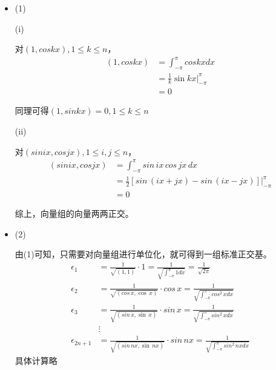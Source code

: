 \documentclass{article}
\begin{document}
\begin{itemize}
  \item (1)

        (i)

        对$(1, cos kx), 1 \leq k \leq n$，
        \begin{align*}
          (1, cos kx) & = \int_{-\pi}^{\pi} cos kx dx            \\
                      & = \frac{1}{k} \sin kx \Big|_{-\pi}^{\pi} \\
                      & = 0
        \end{align*}

        同理可得$(1, sin kx) = 0, 1 \leq k \leq n$

        (ii)

        对$(sin ix, cos jx), 1 \leq i, j \leq n$，
        \begin{align*}
          (sin ix, cos jx) & = \int_{-\pi}^{\pi} sin \, ix \, cos \,jx \, dx                         \\
                           & = \frac{1}{2} [sin \, (ix + jx) - sin \, (ix - jx) ] \Big|_{-\pi}^{\pi} \\
                           & = 0
        \end{align*}

        综上，向量组的向量两两正交。
  \item (2)

        由(1)可知，只需要对向量组进行单位化，就可得到一组标准正交基。
        \begin{align*}
          \epsilon_1    & = \frac{1}{\sqrt{(1, 1)}} \cdot 1 = \frac{1}{\sqrt{\int_{-\pi}^{\pi} 1 dx}} = \frac{1}{\sqrt{2 \pi}}     \\
          \epsilon_2    & = \frac{1}{\sqrt{(cos\, x, \cos\, x)}} \cdot cos \, x = \frac{1}{\sqrt{\int_{-\pi}^{\pi} cos^2 \, x dx}} \\
          \epsilon_3    & = \frac{1}{\sqrt{(sin\, x, \sin\, x)}} \cdot sin \, x = \frac{1}{\sqrt{\int_{-\pi}^{\pi} sin^2 \, x dx}} \\
                        & \vdots                                                                                                   \\
          \epsilon_{2n + 1} & = \frac{1}{\sqrt{(sin\, nx, \sin\, nx)}} \cdot sin \, nx = \frac{1}{\sqrt{\int_{-\pi}^{\pi} sin^2 \, nx dx}} 
        \end{align*}
        具体计算略
\end{itemize}
\end{document}
